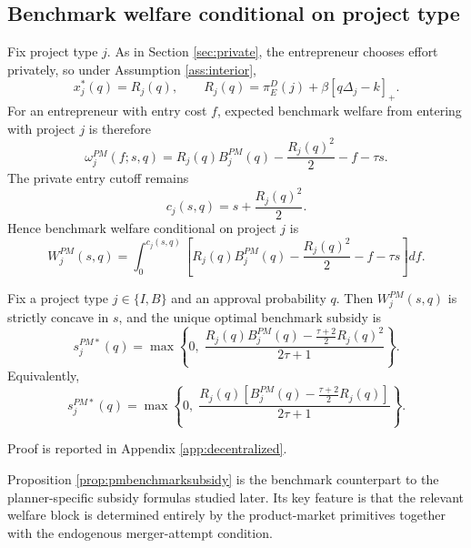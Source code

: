 \subsection{Benchmark welfare conditional on project type}

Fix project type $j$. As in Section \ref{sec:private}, the entrepreneur chooses effort privately, so under Assumption \ref{ass:interior},
\begin{equation}
    x_j^*(q)=R_j(q),
    \qquad
    R_j(q)=\pi_E^D(j)+\beta[q\Delta_j-k]_+.
\end{equation}
For an entrepreneur with entry cost $f$, expected benchmark welfare from entering with project $j$ is therefore
\begin{equation}\label{eq:omegajPM}
    \omega_j^{PM}(f;s,q)
    =
    R_j(q)B_j^{PM}(q)
    -
    \frac{R_j(q)^2}{2}
    -
    f
    -
    \tau s.
\end{equation}
The private entry cutoff remains
\begin{equation}\label{eq:cjqPM}
    c_j(s,q)=s+\frac{R_j(q)^2}{2}.
\end{equation}
Hence benchmark welfare conditional on project $j$ is
\begin{equation}\label{eq:WjPM}
    W_j^{PM}(s,q)
    =
    \int_0^{c_j(s,q)}
    \left[
        R_j(q)B_j^{PM}(q)-\frac{R_j(q)^2}{2}-f-\tau s
    \right]df.
\end{equation}

\begin{proposition}\label{prop:pmbenchmarksubsidy}
Fix a project type $j\in\{I,B\}$ and an approval probability $q$. Then $W_j^{PM}(s,q)$ is strictly concave in $s$, and the unique optimal benchmark subsidy is
\begin{equation}\label{eq:sjPMstar}
    s_j^{PM*}(q)
    =
    \max\left\{
        0,\;
        \frac{
            R_j(q)B_j^{PM}(q)-\frac{\tau+2}{2}R_j(q)^2
        }{2\tau+1}
    \right\}.
\end{equation}
Equivalently,
\begin{equation}
    s_j^{PM*}(q)
    =
    \max\left\{
        0,\;
        \frac{
            R_j(q)\left[B_j^{PM}(q)-\frac{\tau+2}{2}R_j(q)\right]
        }{2\tau+1}
    \right\}.
\end{equation}
\end{proposition}

Proof is reported in Appendix \ref{app:decentralized}.

Proposition \ref{prop:pmbenchmarksubsidy} is the benchmark counterpart to the planner-specific subsidy formulas studied later. Its key feature is that the relevant welfare block is determined entirely by the product-market primitives together with the endogenous merger-attempt condition.

